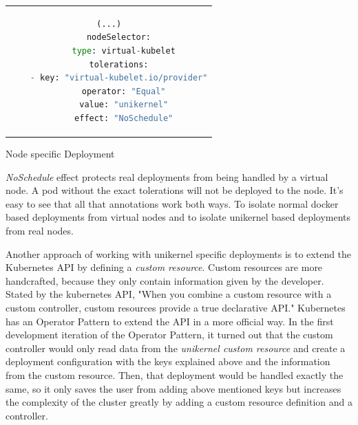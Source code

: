\begin{code}[htpb]
  \centering
  \begin{tabular}{c}
  \begin{lstlisting}[language=python]
    (...)
    nodeSelector:
      type: virtual-kubelet
    tolerations:
    - key: "virtual-kubelet.io/provider"
      operator: "Equal"
      value: "unikernel"
      effect: "NoSchedule"
\end{lstlisting}
\end{tabular}
\caption{Node specific Deployment}\label{fig:deployment}
\end{code}
\textit{NoSchedule} effect protects real deployments from being handled by a virtual node. A pod without the exact tolerations will not be deployed to the node. It's easy to see that all that annotations work both ways. To isolate normal docker based deployments from virtual nodes and to isolate unikernel based deployments from real nodes.

Another approach of working with unikernel specific deployments is to extend the Kubernetes API by defining a \textit{custom resource}. Custom resources are more handcrafted, because they only contain information given by the developer. Stated by the kubernetes API, "When you combine a custom resource with a custom controller, custom resources provide a true declarative API." Kubernetes has an Operator Pattern to extend the API in a more official way. In the first development iteration of the Operator Pattern, it turned out that the custom controller would only read data from the \textit{unikernel custom resource} and create a deployment configuration with the keys explained above and the information from the custom resource. Then, that deployment would be handled exactly the same, so it only saves the user from adding above mentioned keys but increases the complexity of the cluster greatly by adding a custom resource definition and a controller.

